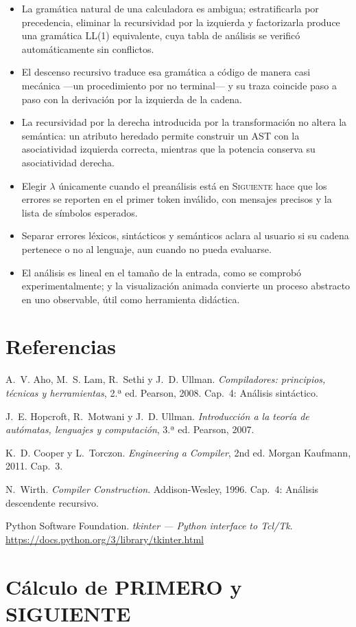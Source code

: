 \documentclass[11pt,a4paper]{article}
\newcommand{\lam}{\textcolor{gris}{\ensuremath{\lambda}}}
\newcommand{\SIGUIENTE}{\textsc{Siguiente}}
\begin{document}
\begin{itemize}[label=\textcolor{acento}{$\blacktriangleright$}]
\item La gramática natural de una calculadora es ambigua; estratificarla por precedencia, eliminar la
      recursividad por la izquierda y factorizarla produce una gramática \textsc{LL(1)} equivalente, cuya
      tabla de análisis se verificó automáticamente sin conflictos.
\item El descenso recursivo traduce esa gramática a código de manera casi mecánica ---un procedimiento por
      no terminal--- y su traza coincide paso a paso con la derivación por la izquierda de la cadena.
\item La recursividad por la derecha introducida por la transformación no altera la semántica: un atributo
      heredado permite construir un AST con la asociatividad izquierda correcta, mientras que la potencia
      conserva su asociatividad derecha.
\item Elegir \lam{} únicamente cuando el preanálisis está en \SIGUIENTE{} hace que los errores se reporten en
      el primer token inválido, con mensajes precisos y la lista de símbolos esperados.
\item Separar errores léxicos, sintácticos y semánticos aclara al usuario si su cadena pertenece o no al
      lenguaje, aun cuando no pueda evaluarse.
\item El análisis es lineal en el tamaño de la entrada, como se comprobó experimentalmente; y la
      visualización animada convierte un proceso abstracto en uno observable, útil como herramienta didáctica.
\end{itemize}

\section*{Referencias}
\begin{enumerate}[label={[\arabic*]}, leftmargin=*, itemsep=4pt]
\item A.~V. Aho, M.~S. Lam, R.~Sethi y J.~D. Ullman. \emph{Compiladores: principios, técnicas y herramientas},
      2.ª ed. Pearson, 2008. Cap.~4: Análisis sintáctico.
\item J.~E. Hopcroft, R.~Motwani y J.~D. Ullman. \emph{Introducción a la teoría de autómatas, lenguajes y
      computación}, 3.ª ed. Pearson, 2007.
\item K.~D. Cooper y L.~Torczon. \emph{Engineering a Compiler}, 2nd ed. Morgan Kaufmann, 2011. Cap.~3.
\item N.~Wirth. \emph{Compiler Construction}. Addison-Wesley, 1996. Cap.~4: Análisis descendente recursivo.
\item Python Software Foundation. \emph{tkinter --- Python interface to Tcl/Tk}.
      \url{https://docs.python.org/3/library/tkinter.html}
\end{enumerate}

\appendix
\section{Cálculo de PRIMERO y SIGUIENTE}

\end{document}
